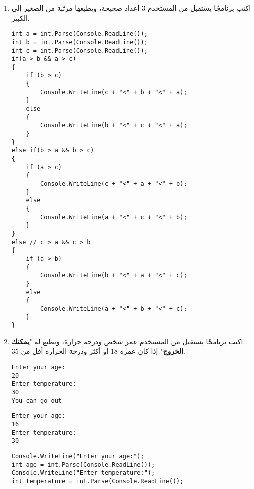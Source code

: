 ﻿\documentclass[12pt]{article}
\begin{document}
\begin{enumerate}[itemsep=3em]
\begin{enumerate}
\item اكتب برنامجًا يستقبل من المستخدم 3 أعداد صحيحة، ويطبعها مرتّبة من الصغير إلى الكبير.

\ifdetailed
\ifwithsols
\begin{boxSolution}
\begin{english}
\begin{verbatim}
int a = int.Parse(Console.ReadLine());
int b = int.Parse(Console.ReadLine());
int c = int.Parse(Console.ReadLine());
if(a > b && a > c)
{
    if (b > c)
    {
        Console.WriteLine(c + "<" + b + "<" + a);
    }
    else
    {
        Console.WriteLine(b + "<" + c + "<" + a);
    }
}
else if(b > a && b > c)
{
    if (a > c)
    {
    	Console.WriteLine(c + "<" + a + "<" + b);
    }
    else
    {
        Console.WriteLine(a + "<" + c + "<" + b);
    }
}
else // c > a && c > b
{
    if (a > b)
    {
    	Console.WriteLine(b + "<" + a + "<" + c);
    }
    else
    {
        Console.WriteLine(a + "<" + b + "<" + c);
    }
}
\end{verbatim}
\end{english}
\end{boxSolution}
\fi
\clearpage
\fi

\item
اكتب برنامجًا يستقبل من المستخدم عمر شخص ودرجة حرارة، ويطبع له "\textbf{يمكنك الخروج}" إذا كان عمره 18 أو أكثر ودرجة الحرارة أقل من 35.
\ifdetailed
\begin{boxExample}[1]
\begin{english}
\begin{verbatim}
Enter your age:
20
Enter temperature:
30
You can go out
\end{verbatim}
\end{english}
\end{boxExample}
\begin{boxExample}[2]
\begin{english}
\begin{verbatim}
Enter your age:
16
Enter temperature:
30
\end{verbatim}
\end{english}
\end{boxExample}

\ifwithsols
\begin{boxSolution}
\begin{english}
\begin{verbatim}
Console.WriteLine("Enter your age:");
int age = int.Parse(Console.ReadLine());
Console.WriteLine("Enter temperature:");
int temperature = int.Parse(Console.ReadLine());


\end{verbatim}
\end{english}
\end{boxSolution}
\end{enumerate}
\end{enumerate}
\end{document}
